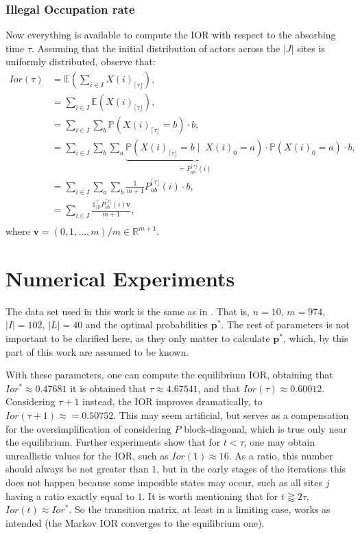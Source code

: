 \documentclass{article}
\newcommand{\pp}{\mathbf{p}}
\newcommand{\p}{\mathds{P}}
\newcommand{\E}{\mathds{E}}
\newcommand{\vv}{\mathbf{v}}
\begin{document}
\subsubsection{Illegal Occupation rate}
Now everything is available to compute the IOR with respect to the absorbing time $\tau$. Assuming that the initial distribution of actors across the $|J|$ sites is uniformly distributed, observe that:
\begin{align*}
	Ior(\tau) 	&= \E\left(\sum\limits_{i \in I} X(i)_{\lceil \tau \rfloor}\right),\\
				&= \sum\limits_{i \in I} \E(X(i)_{\lceil \tau \rfloor}),\\
				&= \sum\limits_{i \in I} \sum\limits_{b} \p(X(i)_{\lceil \tau \rfloor} = b)\cdot b,\\
				&= \sum\limits_{i \in I} \sum\limits_{b}\sum\limits_{a} \underbrace{\p(X(i)_{\lceil \tau \rfloor} = b \; \vert \;\;X(i)_{0} = a)}_{ = P^{{\lceil \tau \rfloor}}_{ab}(i)} \cdot \p(X(i)_0 = a)\cdot b,\\
				&= \sum\limits_{i \in I} \sum\limits_{a}\sum\limits_{b} \frac{1}{m+1}P^{{\lceil \tau \rfloor}}_{ab}(i)\cdot b,\\
				&= \sum\limits_{i \in I} \frac{\mathbb{1}_{|I|}^{\top}P^{{\lceil \tau \rfloor}}_{ab}(i)\vv}{m+1},\\
\end{align*}
where $\vv = (0, 1, \dots, m)/m \in \mathds{R}^{m+1}$.\par

\section{Numerical Experiments}\label{sec4}
The data set used in this work is the same as in \citep{Carrasco}. That is, $n=10$, $m = 974$, $|I| = 102$, $|L| = 40$ and the optimal probabilities $\pp^*$. The rest of parameters is not important to be clarified here, as they only matter to calculate $\pp^*$, which, by this part of this work are assumed to be known.\par
With these parameters, one can compute the equilibrium IOR, obtaining that $Ior^* \approx 0.47681$ it is obtained that $\tau \approx 4.67541$, and that $Ior(\tau) \approx 0.60012$. Considering $\tau+1$ instead, the IOR improves dramatically, to $Ior(\tau+1) \approx = 0.50752$. This may seem artificial, but serves as a compensation for the oversimplification of considering $P$ block-diagonal, which is true only near the equilibrium. Further experiments show that for $t < \tau$, one may obtain unreallistic values for the IOR, such as $Ior(1) \approx 16$. As a ratio, this number should always be not greater than $1$, but in the early stages of the iterations this does not happen because some imposible states may occur, such as all sites $j$ having a ratio exactly equal to $1$. It is worth mentioning that for $t \gtrapprox 2\tau$, $Ior(t) \approx Ior^*$. So the transition matrix, at least in a limiting case, works as intended (the Markov IOR converges to the equilibrium one).\par
\end{document}
